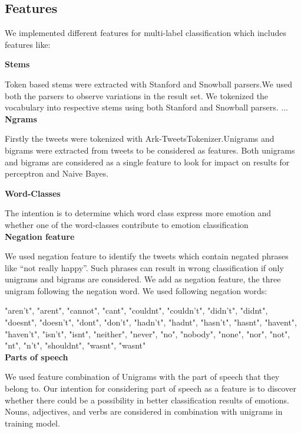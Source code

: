 \documentclass[11pt]{article}
\begin{document}
  
  
  \subsection{Features}
  
  We implemented different features for multi-label classification which includes features like:
  
  
  {\bf Stems}
  
  
  Token based stems were extracted with Stanford and Snowball parsers.We used both the parsers to observe variations in the result set. We tokenized the vocabulary into respective stems using both Stanford and Snowball parsers.
  ...\\
  
  
  {\bf Ngrams}
  
  Firstly the tweets were tokenized with Ark-TweetsTokenizer.Unigrams and bigrams were extracted from tweets to be considered as features. Both unigrams and bigrams are considered as a single feature to look for impact on results for perceptron and Naive Bayes.
  
  
  {\bf Word-Classes}
  
  
  The intention is to determine which word class express more emotion and whether one of the word-classes contribute to emotion classification\\
  
  
  {\bf Negation feature}
  
  
  We used negation feature to identify the tweets which contain negated phrases like “not really happy”. Such phrases can result in wrong
  classification if only unigrams and bigrams are considered. We add as negation feature, the three unigram following the negation word. We used
  following negation words:
  
  "aren’t", "arent", "cannot", "cant", "couldnt", "couldn’t", "didn’t", "didnt", "doesnt", "doesn’t", "dont", "don’t", "hadn’t", "hadnt", "hasn’t",
  "hasnt", "havent", "haven’t", "isn’t", "isnt", "neither", "never", "no", "nobody", "none", "nor", "not", "nt", "n’t", "shouldnt", "wasnt", "wasnt"\\
  
  {\bf Parts of speech}
  
  
  We used feature combination of Unigrams with the part of speech that they belong to. Our intention for considering part of speech as a feature is to discover
  whether there could be a possibility in better classification results of emotions. Nouns, adjectives, and verbs are considered in combination
  with unigrams in training model. \\
  
\end{document}
